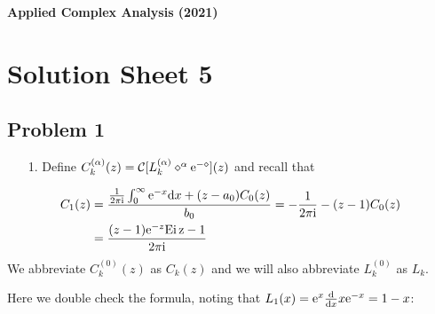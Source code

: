 \documentclass[12pt,a4paper]{article}
\def\D{ {\rm d} }
\def\I{ {\rm i} }
\def\E{ {\rm e} }
\def\CC{ {\cal C} }
\def\Ei{ {\rm Ei}\, }
\def\dx{\D x}
\def\Ei{\rm Ei\,}
\begin{document}
\textbf{Applied Complex Analysis (2021)}

\section{Solution Sheet 5}
\subsection{Problem 1}
\begin{itemize}
\item[1. ] Define $C_k^{(\alpha)}(z) = \CC[L_k^{(\alpha)} \diamond^\alpha \E^{-\diamond}](z)$ and recall that

\end{itemize}

\begin{align*}
C_1(z)  &= {{1 \over 2 \pi \I} \int_0^\infty \E^{-x} \dx + (z-a_0) C_0(z) \over b_0} = -{1 \over 2 \pi \I}  - (z-1) C_0(z)    \\
&= {(z-1) \E^{-z} \Ei z -1 \over 2 \pi \I}
\end{align*}
We abbreviate $C_k^{(0)}(z)$ as $C_k(z)$ and we will also abbreviate $L_k^{(0)}$ as $L_k$.

Here we double check the formula, noting that $L_1(x) = \E^x {\D \over \dx} x \E^{-x} = 1 - x$:
\end{document}
